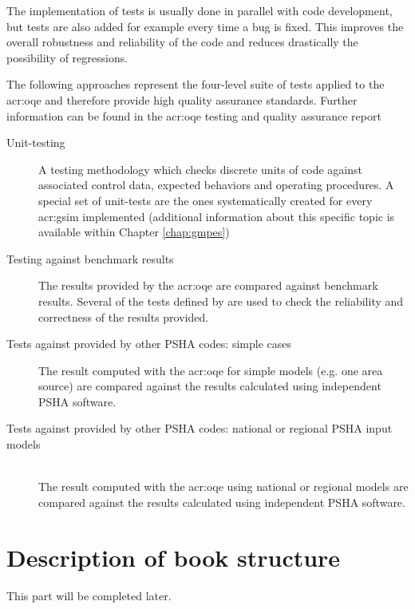 The implementation of tests is usually done in parallel with code development,
but tests are also added for example every time a bug is fixed.
%
This improves the overall robustness and reliability of the code and reduces
drastically the possibility of regressions.

The following approaches represent the four-level suite of tests applied to the
\gls{acr:oqe} and therefore provide high quality assurance standards. Further
information can be found in the \gls{acr:oqe} testing and quality assurance
report \citep{pagani2014_oqtesting} 
%
\begin{description}
    \item [Unit-testing] A testing methodology which checks discrete 
        units of code against associated control data, expected behaviors 
        and operating procedures. A special set of unit-tests are the ones
        systematically created for every \gls{acr:gsim} implemented 
        (additional information about this specific topic is available within 
        Chapter \ref{chap:gmpes})
    \item [Testing against benchmark results] The results provided by the 
        \gls{acr:oqe} are compared against benchmark results. Several of the 
        tests defined by \textcite{thomas2010} are used to check the 
        reliability and correctness of the results provided. 
    \item [Tests against provided by other PSHA codes: simple cases] 
        The result computed with the \gls{acr:oqe} for simple models (e.g. one
        area source) are compared against the results calculated using 
        independent PSHA software.
    \item [Tests against provided by other PSHA codes: national or regional 
        PSHA input models] \hfill \\ The result computed with the \gls{acr:oqe} 
        using national or regional models are compared against the 
        results calculated using independent PSHA software.
\end{description}
%
%
%
%
%
\section{Description of book structure}
This part will be completed later.
